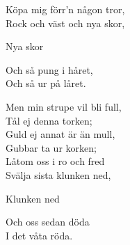 Köpa mig förr'n någon tror,\\
Rock och väst och nya skor,\par
\hspace{20pt}\revrpt Nya skor\rpt\hspace{5pt}{\footnotesize 4x}\par
Och så pung i håret,\\
Och så ur på låret.\par
\vspace{10pt}
Men min strupe vil bli full,\\
Tål ej denna torken;\\
Guld ej annat är än mull,\\
Gubbar ta ur korken;\\
Låtom oss i ro och fred\\
Svälja sista klunken ned,\par
\hspace{20pt}\revrpt Klunken ned\rpt\hspace{5pt}{\footnotesize 4x}\par
Och oss sedan döda\\
I det våta röda.
